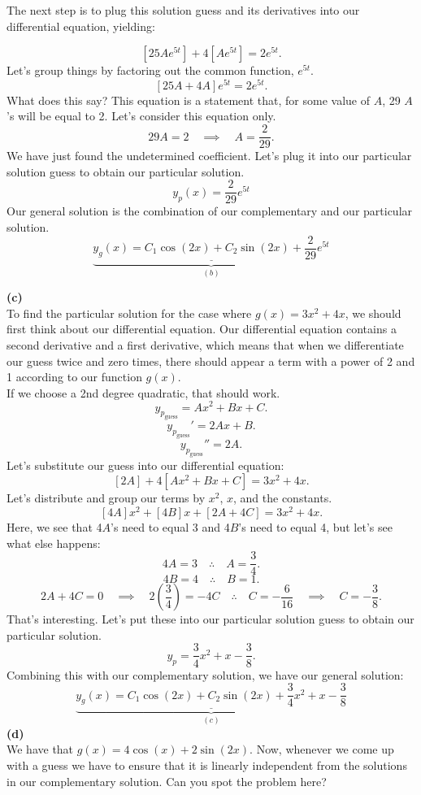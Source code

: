 \documentclass[a4paper,12pt]{article} %
\begin{document}
The next step is to plug this solution guess and its derivatives into our differential equation, yielding:

$$ \left[25Ae^{5t}\right] + 4\left[Ae^{5t}\right] = 2e^{5t}. $$
Let's group things by factoring out the common function, $e^{5t}$.
$$ [25A + 4A]e^{5t} = 2e^{5t}. $$
What does this say? This equation is a statement that, for some value of $A$, 29 $A$'s will be equal to 2. Let's consider this equation only.
$$ 29A = 2 \quad\implies\quad A = \frac{2}{29}. $$
We have just found the undetermined coefficient. Let's plug it into our particular solution guess to obtain our particular solution.
$$ \boxed{y_p(x) = \frac{2}{29}e^{5t}} $$
Our general solution is the combination of our complementary and our particular solution.
$$ \underbrace{\underline{\boxed{y_{g}(x) = C_1\cos{(2x)} + C_2\sin{(2x)} + \frac{2}{29}e^{5t}}}}_{(b)} $$

\textbf{(c)}\\
To find the particular solution for the case where $g(x)=3 x^2+4 x$, we should first think about our differential equation. Our differential equation contains a second derivative and a first derivative, which means that when we differentiate our guess twice and zero times, there should appear a term with a power of 2 and 1 according to our function $g(x)$.\\

If we choose a 2nd degree quadratic, that should work.
$$ y_{p_{\text{guess}}} = Ax^2 + Bx + C. $$
$$  y_{p_{\text{guess}}}' = 2Ax + B. $$
$$  y_{p_{\text{guess}}}'' = 2A. $$
Let's substitute our guess into our differential equation:
$$ \left[2A\right] + 4\left[Ax^2 + Bx + C\right] = 3x^2 + 4x. $$
Let's distribute and group our terms by $x^2$, $x$, and the constants.
$$ [4A]x^2 + [4B]x + [2A + 4C] = 3x^2 + 4x. $$
Here, we see that 4$A$'s need to equal 3 and 4$B$'s need to equal 4, but let's see what else happens:
$$ 4A = 3 \quad\therefore\quad A = \frac{3}{4}. $$
$$ 4B = 4 \quad\therefore\quad B = 1. $$
$$ 2A + 4C = 0 \quad\implies\quad 2\left(\frac{3}{4}\right) = -4C \quad\therefore\quad C = -\frac{6}{16} \quad\implies\quad C = -\frac{3}{8}. $$
That's interesting. Let's put these into our particular solution guess to obtain our particular solution.
$$ y_{p} = \frac{3}{4}x^2 + x -\frac{3}{8}. $$
Combining this with our complementary solution, we have our general solution:
$$ \underbrace{\underline{\boxed{y_g(x) = C_1\cos{(2x)} + C_2\sin{(2x)} + \frac{3}{4}x^2 + x -\frac{3}{8}}}}_{(c)} $$
\textbf{(d)}\\
We have that $g(x)=4 \cos (x)+2 \sin (2 x)$. Now, whenever we come up with a guess we have to ensure that it is linearly independent from the solutions in our complementary solution. Can you spot the problem here?\\
\end{document}
